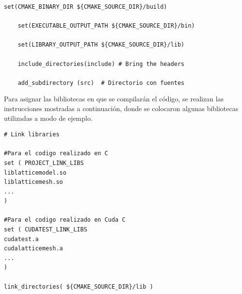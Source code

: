 

{\footnotesize
	\begin{frame}{}
		\begin{lstlisting}[frame=single]
	set(CMAKE_BINARY_DIR ${CMAKE_SOURCE_DIR}/build)

	set(EXECUTABLE_OUTPUT_PATH ${CMAKE_SOURCE_DIR}/bin)

	set(LIBRARY_OUTPUT_PATH ${CMAKE_SOURCE_DIR}/lib)

	include_directories(include) # Bring the headers
	
	add_subdirectory (src) 	# Directorio con fuentes

		\end{lstlisting}
		
	\end{frame}
}


Para asignar las bibliotecas en que se compilarán el código, se realizan las instrucciones mostradas a continuación, donde se colocaron algunas bibliotecas utilizadas a modo de ejemplo.
\newpage
{\footnotesize
	\begin{frame}{}
		\begin{lstlisting}[frame=single]
# Link libraries

#Para el codigo realizado en C
set ( PROJECT_LINK_LIBS 
liblatticemodel.so 		
liblatticemesh.so
...
)

#Para el codigo realizado en Cuda C
set ( CUDATEST_LINK_LIBS 
cudatest.a
cudalatticemesh.a
...
)

link_directories( ${CMAKE_SOURCE_DIR}/lib )
		
		\end{lstlisting}
		
	\end{frame}
}

